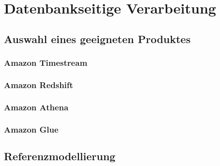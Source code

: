 \section{Datenbankseitige Verarbeitung}

\subsection{Auswahl eines geeigneten Produktes}

\subsubsection{Amazon Timestream}

\subsubsection{Amazon Redshift}

\subsubsection{Amazon Athena}

\subsubsection{Amazon Glue}

\subsection{Referenzmodellierung}